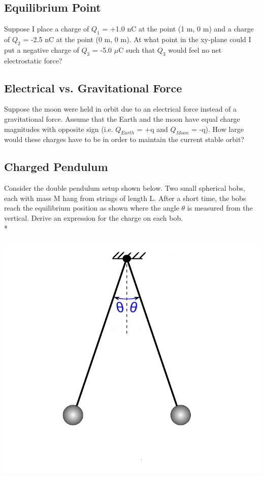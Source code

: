 \documentclass[11pt]{article}
\begin{document}
\subsection{Equilibrium Point}
Suppose I place a charge of $Q_1$ = +1.0 nC at the point (1 m, 0 m) and a charge of $Q_2$ = -2.5 nC at the point (0 m, 0 m).  At what point in the xy-plane could I put a negative charge of $Q_3$ = -5.0 $\mu$C such that $Q_3$ would feel no net electrostatic force?

\subsection{Electrical vs. Gravitational Force}
Suppose the moon were held in orbit due to an electrical force instead of a gravitational force.  Assume that the Earth and the moon have equal charge magnitudes with opposite sign (i.e. $Q_{Earth}$ = +q and $Q_{Moon}$ = -q).  How large would these charges have to be in order to maintain the current stable orbit?

\subsection{Charged Pendulum}
Consider the double pendulum setup shown below.  Two small spherical bobs, each with mass M hang from strings of length L.  After a short time, the bobs reach the equilibrium position as shown where the angle $\theta$ is measured from the vertical.  Derive an expression for the charge on each bob.\\*

\begin{center}
\includegraphics[scale=0.25]{Images/pendulum.png}
\end{center}
\end{document}
